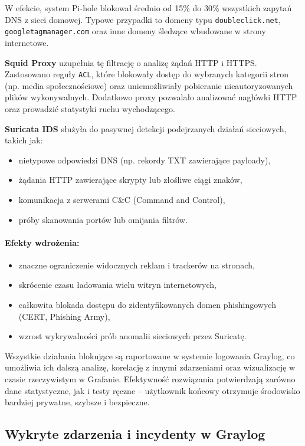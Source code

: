 \documentclass[
    left=2.5cm,         %
    right=2.5cm,        %
    top=2.5cm,          %
    bottom=3cm,         %
    bindingoffset=6mm,  %
    nohyphenation=true %
]{eiti/eiti-thesis} %
\begin{document}
W efekcie, system Pi-hole blokował średnio od 15\% do 30\% wszystkich zapytań DNS z sieci domowej. Typowe przypadki to domeny typu \texttt{doubleclick.net}, \texttt{googletagmanager.com} oraz inne domeny śledzące wbudowane w strony internetowe.

\textbf{Squid Proxy} uzupełnia tę filtrację o analizę żądań HTTP i HTTPS. Zastosowano reguły \texttt{ACL}, które blokowały dostęp do wybranych kategorii stron (np. media społecznościowe) oraz uniemożliwiały pobieranie nieautoryzowanych plików wykonywalnych. Dodatkowo proxy pozwalało analizować nagłówki HTTP oraz prowadzić statystyki ruchu wychodzącego.

\textbf{Suricata IDS} służyła do pasywnej detekcji podejrzanych działań sieciowych, takich jak:
\begin{itemize}
    \item nietypowe odpowiedzi DNS (np. rekordy TXT zawierające payloady),
    \item żądania HTTP zawierające skrypty lub złośliwe ciągi znaków,
    \item komunikacja z serwerami C\&C (Command and Control),
    \item próby skanowania portów lub omijania filtrów.
\end{itemize}

\paragraph{Efekty wdrożenia:}
\begin{itemize}
    \item znaczne ograniczenie widocznych reklam i trackerów na stronach,
    \item skrócenie czasu ładowania wielu witryn internetowych,
    \item całkowita blokada dostępu do zidentyfikowanych domen phishingowych (CERT, Phishing Army),
    \item wzrost wykrywalności prób anomalii sieciowych przez Suricatę.
\end{itemize}

Wszystkie działania blokujące są raportowane w systemie logowania Graylog, co umożliwia ich dalszą analizę, korelację z innymi zdarzeniami oraz wizualizację w czasie rzeczywistym w Grafanie. Efektywność rozwiązania potwierdzają zarówno dane statystyczne, jak i testy ręczne – użytkownik końcowy otrzymuje środowisko bardziej prywatne, szybsze i bezpieczne.


\subsection{Wykryte zdarzenia i incydenty w Graylog}
\end{document}
